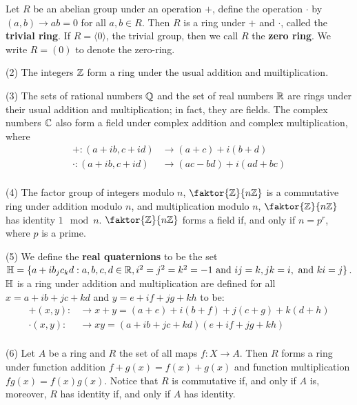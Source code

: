 \begin{example}\label{example_5.1}
  Let $R$ be an abelian group under an operation $+$, define the operation
  $\cdot$ by  $(a,b) \xrightarrow{} ab=0$ for all $a,b \in R$. Then $R$ is a
  ring under $+$ and  $\cdot$, called the  \textbf{trivial ring}. If
  $R=\langle 0 \rangle$, the trivial group, then we call $R$ the  \textbf{zero
  ring}. We write $R=(0)$ to denote the zero-ring.

\item[(2)] The integers $\mathbb{Z}$ form a ring under the usual addition and
  muiltiplication.

\item[(3)] The sets of rational numbers $\mathbb{Q}$ and the set of real numbers
  $\mathbb{R}$ are rings under their usual addition and multiplication; in fact,
  they are fields. The complex numbers $\mathbb{C}$ also form a field under
  complex addition and complex multiplication, where
  \begin{align*}
    +:(a+ib,c+id)   &   \xrightarrow{} (a+c)+i(b+d)   \\
    \cdot:(a+ib,c+id)   &   \xrightarrow{} (ac-bd)+i(ad+bc)   \\
  \end{align*}

\item[(4)] The factor group of integers modulo $n$, $\faktor{\Z}{n\Z}$ is a
  commutative ring under addition modulo $n$, and multiplication modulo
  $n$, $\faktor{\Z}{n\Z}$ has identity $1 \mod{n}$. $\faktor{\Z}{n\Z}$
  forms a field if, and only if $n=p^r$, where $p$ is a prime.

\item[(5)] We define the \textbf{real quaternions} to be the set
  $\mathbb{H}=\{a+ib_jc_kd : a,b,c,d \in \mathbb{R}, i^2=j^2=k^2=-1 \text{ and } ij=k,
  jk=i, \text{ and } ki=j\}$. $\mathbb{H}$ is a ring under addition and
  multiplication are defined for all $x=a+ib+jc+kd$ and $y=e+if+jg+kh$ to be:
  \begin{align*}
    +(x,y): &   \xrightarrow{} x+y=(a+e)+i(b+f)+j(c+g)+k(d+h)   \\
    \cdot(x,y):  &   \xrightarrow{} xy= (a+ib+jc+kd)(e+if+jg+kh) \\
  \end{align*}

\item[(6)] Let $A$ be a ring and $R$ the set of all maps $f:X \xrightarrow{}
  A$. Then $R$ forms a ring under function addition  $f+g(x)=f(x)+g(x)$ and
  function multiplication $fg(x)=f(x)g(x)$. Notice that $R$ is commutative if,
  and only if  $A$ is, moreover,  $R$ has identity if, and only if  $A$ has
  identity.


\end{example}
